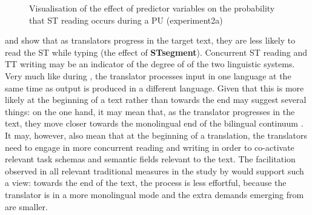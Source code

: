 \documentclass[output=paper]{LSP/langsci}
\begin{document}
 
\begin{figure}
\caption{Visualisation of the effect of predictor variables on the probability that ST reading occurs during a PU (experiment2a)}
\label{schaeffer-carl:fig:5}
\end{figure}


 and  show that as translators progress in the target text, they are less likely to read the ST while typing (the effect of \textbf{STsegment}). Concurrent ST reading and TT writing may be an indicator of the degree of  of the two linguistic systems. Very much like during , the translator processes input in one language at the same time as output is produced in a different language. Given that this is more likely at the beginning of a text rather than towards the end may suggest several things: on the one hand, it may mean that, as the translator progresses in the text, they move closer towards the monolingual end of the bilingual continuum \citep{Grosjean1997}. It may, however, also mean that at the beginning of a translation, the translators need to engage in more concurrent reading and writing in order to co-activate relevant task schemas and semantic fields relevant to the text. The facilitation observed in all relevant traditional  measures in the study by \citet{Schaeffer2016Word} would support such a view: towards the end of the text, the process is less effortful, because the translator is in a more monolingual mode and the extra demands emerging from  are smaller.\\
\end{document}
